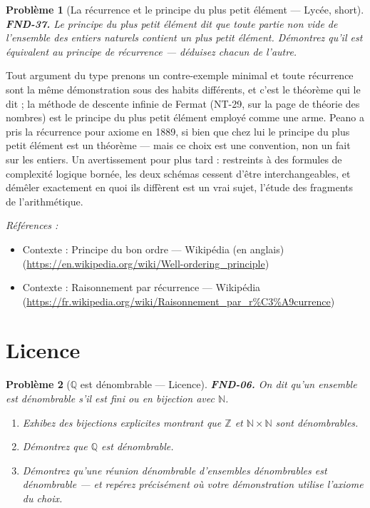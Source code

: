 \documentclass[11pt]{article}
\newtheorem{problem}{Problème}
\newenvironment{refs}{\par\small\noindent\emph{Références :}\begin{itemize}\setlength\itemsep{0pt}}{\end{itemize}\normalsize}
\begin{document}
\bigskip

\begin{problem}[{La récurrence et le principe du plus petit élément --- Lycée, short}]
\textbf{FND-37.} Le \textit{principe du plus petit élément} dit que toute partie
non vide de l'ensemble des entiers naturels contient un plus petit élément. Démontrez qu'il est
équivalent au principe de récurrence --- déduisez chacun de l'autre.
\end{problem}

\noindent Tout argument du type \og{} prenons un contre-exemple minimal \fg{} et toute récurrence
sont la même démonstration sous des habits différents, et c'est le théorème qui le dit ; la
méthode de descente infinie de Fermat (NT-29, sur la page de théorie des nombres) est le principe
du plus petit élément employé comme une arme. Peano a pris la récurrence pour axiome en 1889, si
bien que chez lui le principe du plus petit élément est un théorème --- mais ce choix est une
convention, non un fait sur les entiers. Un avertissement pour plus tard : restreints à des
formules de complexité logique bornée, les deux schémas cessent d'être interchangeables, et
démêler exactement en quoi ils diffèrent est un vrai sujet, l'étude des fragments de
l'arithmétique.

\begin{refs}
\item Contexte : Principe du bon ordre --- Wikipédia (en anglais) (\url{https://en.wikipedia.org/wiki/Well-ordering_principle})
\item Contexte : Raisonnement par récurrence --- Wikipédia (\url{https://fr.wikipedia.org/wiki/Raisonnement_par_r%C3%A9currence})
\end{refs}

\bigskip


\section*{Licence}

\begin{problem}[{$\mathbb{Q}$ est dénombrable --- Licence}]
\textbf{FND-06.} On dit qu'un ensemble est \textit{dénombrable} s'il est fini ou en
bijection avec $ \mathbb{N} $.
\begin{enumerate}
\item[(a)] Exhibez des bijections explicites montrant que
$ \mathbb{Z} $ et $ \mathbb{N} \times \mathbb{N} $ sont dénombrables.
\item[(b)] Démontrez que
$ \mathbb{Q} $ est dénombrable.
\item[(c)] Démontrez qu'une réunion dénombrable d'ensembles
dénombrables est dénombrable --- et repérez précisément où votre démonstration utilise l'axiome du
choix.
\end{enumerate}

\end{problem}
\end{document}
